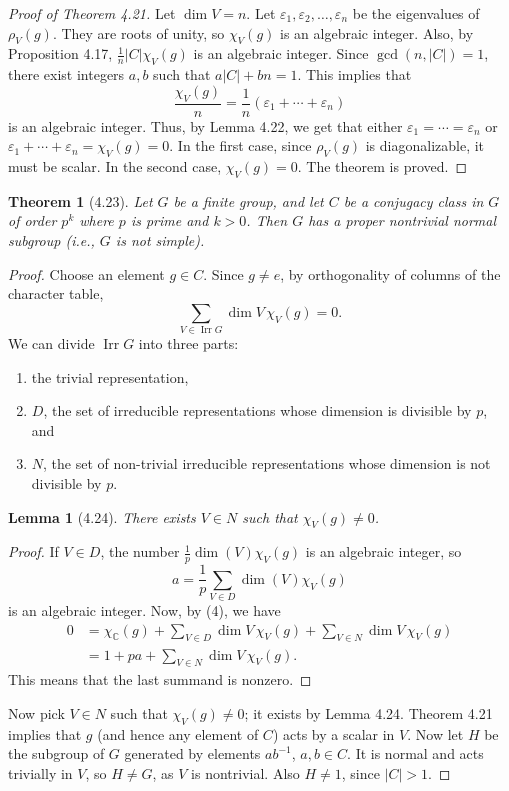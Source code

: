 \documentclass[UTF8,11pt]{ctexart}
\newtheorem*{theorem}{Theorem}
\newtheorem*{lemma}{Lemma}
\theoremstyle{definition}
\newcommand{\C}{\mathbb C}
\begin{document}
\begin{proof}[Proof of Theorem 4.21]
Let $\dim V=n$. Let $\varepsilon_1,\varepsilon_2,\ldots,\varepsilon_n$ be the eigenvalues of $\rho_V(g)$. They are roots of unity, so $\chi_V(g)$ is an algebraic integer. Also, by Proposition 4.17, $\frac1n|C|\chi_V(g)$ is an algebraic integer. Since $\gcd(n,|C|)=1$, there exist integers $a,b$ such that $a|C|+bn=1$. This implies that
\[
\frac{\chi_V(g)}n=\frac1n(\varepsilon_1+\cdots+\varepsilon_n)
\]
is an algebraic integer. Thus, by Lemma 4.22, we get that either $\varepsilon_1=\cdots=\varepsilon_n$ or $\varepsilon_1+\cdots+\varepsilon_n=\chi_V(g)=0$. In the first case, since $\rho_V(g)$ is diagonalizable, it must be scalar. In the second case, $\chi_V(g)=0$. The theorem is proved.
\end{proof}
\begin{theorem}[4.23]
Let $G$ be a finite group, and let $C$ be a conjugacy class in $G$ of order $p^k$ where $p$ is prime and $k>0$. Then $G$ has a proper nontrivial normal subgroup (i.e., $G$ is not simple).
\end{theorem}
\begin{proof}
Choose an element $g\in C$. Since $g\ne e$, by orthogonality of columns of the character table,
\[
\sum_{V\in\operatorname{Irr}G}\dim V\,\chi_V(g)=0.\tag{4}
\]
We can divide $\operatorname{Irr}G$ into three parts:
\begin{enumerate}
\item the trivial representation,
\item $D$, the set of irreducible representations whose dimension is divisible by $p$, and
\item $N$, the set of non-trivial irreducible representations whose dimension is not divisible by $p$.
\end{enumerate}
\begin{lemma}[4.24]
There exists $V\in N$ such that $\chi_V(g)\ne0$.
\end{lemma}
\begin{proof}
If $V\in D$, the number $\frac1p\dim(V)\chi_V(g)$ is an algebraic integer, so
\[
a=\frac1p\sum_{V\in D}\dim(V)\chi_V(g)
\]
is an algebraic integer. Now, by (4), we have
\[
\begin{aligned}
0&=\chi_{\C}(g)+\sum_{V\in D}\dim V\,\chi_V(g)+\sum_{V\in N}\dim V\,\chi_V(g)\\
 &=1+pa+\sum_{V\in N}\dim V\,\chi_V(g).
\end{aligned}
\]
This means that the last summand is nonzero.
\end{proof}
Now pick $V\in N$ such that $\chi_V(g)\ne0$; it exists by Lemma 4.24. Theorem 4.21 implies that $g$ (and hence any element of $C$) acts by a scalar in $V$. Now let $H$ be the subgroup of $G$ generated by elements $ab^{-1}$, $a,b\in C$. It is normal and acts trivially in $V$, so $H\ne G$, as $V$ is nontrivial. Also $H\ne1$, since $|C|>1$.
\end{proof}
\end{document}
